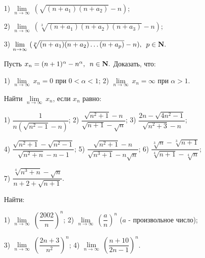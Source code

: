 \documentclass{article}
\begin{document}
1) $ \lim\limits_{n \to \infty}\ (\sqrt{(n+a_1)(n+a_2)} - n) $;

2) $ \lim\limits_{n \to \infty}\ (\sqrt[3]{(n+a_1)(n+a_2)(n+a_3)} - n) $;

3) $ \lim\limits_{n \to \infty}\ (\sqrt[p]{(n+a_1)(n+a_2)\dots(n+a_p)} - n), \hspace{5pt} p \in {\bf N.} $

\par{} Пусть $ x_n = (n + 1)^{\alpha} - n^{\alpha}, \hspace{5pt}n \in {\bf N.} $
Доказать, что:

1) $ \lim\limits_{n \to \infty}\ x_n = 0 $ при $ 0 < \alpha < 1 $;
\hspace{10pt} 2) $ \lim\limits_{n \to \infty}\ x_n = \infty $ при $ \alpha > 1 $.

\par{} Найти $ \lim\limits_{n \to \infty}\ x_n $, если $ x_n $ равно:

1) $ \dfrac{1}{n(\sqrt{n^2-1} - n)} $; \hspace{10pt} 2) $ \dfrac{\sqrt{n^2+1} - n}{\sqrt{n+1} - \sqrt{n}} $; \hspace{10pt} 3) $ \dfrac{2n - \sqrt{4n^2-1}}{\sqrt{n^2+3} - n} $;

4) $ \dfrac{\sqrt{n^2+1} - \sqrt{n^2-1}}{\sqrt{n^2+n} - n - 1} $; \hspace{10pt}
5) $ \dfrac{\sqrt{n^2+1}-n}{\sqrt{n^3+1} - n\sqrt{n}} $; \hspace{10pt}
6) $ \dfrac{\sqrt[3]{n} - \sqrt[3]{n+1}}{\sqrt[4]{n+1} - \sqrt[4]{n}} $;

7) $ \dfrac{\sqrt[4]{n^3+n} - \sqrt{n}}{n+2+\sqrt{n+1}} $.

\par{} Найти:

1) $ \lim\limits_{n \to \infty}\ \left(\dfrac{2002}{n}\right)^n $; \hspace{10pt}
2) $ \lim\limits_{n \to \infty}\ \left(\dfrac{a}{n}\right)^n $ ($ a $ - произвольное число);

3) $ \lim\limits_{n \to \infty}\ \left(\dfrac{2n+3}{n^2}\right)^n $; \hspace{10pt}
4) $ \lim\limits_{n \to \infty}\ \left(\dfrac{n+10}{2n-1}\right)^n $.
\end{document}
